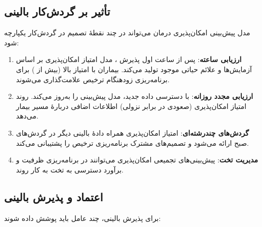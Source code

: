 \subsection{تأثیر بر گردش‌کار بالینی}

مدل پیش‌بینی امکان‌پذیری درمان می‌تواند در چند نقطۀ تصمیم در گردش‌کار  یکپارچه شود:

\begin{enumerate}
\item \textbf{ارزیابی ساعته}: پس از  ساعت اول پذیرش ، مدل امتیاز امکان‌پذیری بر اساس آزمایش‌ها و علائم حیاتی موجود تولید می‌کند. بیماران با امتیاز بالا (بیش از ) برای برنامه‌ریزی زودهنگام ترخیص علامت‌گذاری می‌شوند.
\item \textbf{ارزیابی مجدد روزانه}: با دسترسی داده جدید، مدل پیش‌بینی را به‌روز می‌کند. روند امتیاز امکان‌پذیری (صعودی در برابر نزولی) اطلاعات اضافی دربارۀ مسیر بیمار می‌دهد.
\item \textbf{گردش‌های چندرشته‌ای}: امتیاز امکان‌پذیری همراه دادۀ بالینی دیگر در گردش‌های صبح ارائه می‌شود و تصمیم‌های مشترک برنامه‌ریزی ترخیص را پشتیبانی می‌کند.
\item \textbf{مدیریت تخت}: پیش‌بینی‌های تجمیعی امکان‌پذیری می‌توانند در برنامه‌ریزی ظرفیت  و برآورد دسترسی به تخت به کار روند.
\end{enumerate}

\subsection{اعتماد و پذیرش بالینی}

برای پذیرش بالینی، چند عامل باید پوشش داده شوند:


